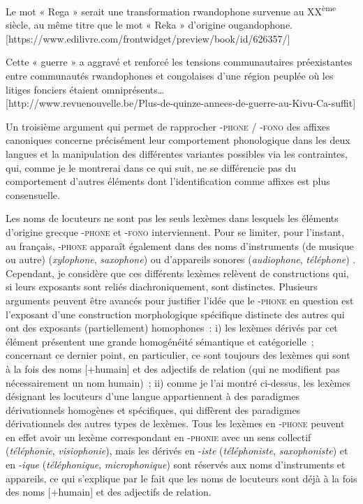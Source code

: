 \documentclass[output=paper]{langsci/langscibook}
\begin{document}
\ea\label{ex:Montermini:4}

  \ea\label{ex:Montermini:4a} Le mot « Rega » serait une transformation rwandophone survenue au
XX\textsuperscript{ème} siècle, au même titre que le mot « Reka »
d'origine ougandophone.\\

{[}https://www.edilivre.com/frontwidget/preview/book/id/626357/{]}

  \ex\label{ex:Montermini:4b} Cette « guerre » a aggravé et renforcé les tensions communautaires
préexistantes entre communautés rwandophones et congolaises d'une région
peuplée où les litiges fonciers étaient omniprésents\ldots{}\\

{[}http://www.revuenouvelle.be/Plus-de-quinze-annees-de-guerre-au-Kivu-Ca-suffit{]}
\z\z

Un troisième argument qui permet de rapprocher -\textsc{phone / -fono}
des affixes canoniques concerne précisément leur comportement
phonologique dans les deux langues et la manipulation des différentes
variantes possibles via les contraintes, qui, comme je le montrerai dans
ce qui suit, ne se différencie pas du comportement d'autres éléments
dont l'identification comme affixes est plus consensuelle.

Les noms de locuteurs ne sont pas les seuls lexèmes dans lesquels les
éléments d'origine grecque -\textsc{phone} et \textsc{-fono}
interviennent. Pour se limiter, pour l'instant, au français,
\textsc{-phone} apparaît également dans des noms d'instruments (de
musique ou autre) (\emph{xylophone}, \emph{saxophone}) ou d'appareils
sonores (\emph{audiophone}, \emph{téléphone}) %
\citep[cf.][179-183]{Lasserre2016}%
%
. Cependant, je considère que ces différents lexèmes relèvent de
constructions qui, si leurs exposants sont reliés diachroniquement, sont
distinctes. Plusieurs arguments peuvent être avancés pour justifier
l'idée que le \textsc{-phone} en question est l'exposant d'une
construction morphologique spécifique distincte des autres qui ont des
exposants (partiellement) homophones~: i) les lexèmes dérivés par cet
élément présentent une grande homogénéité sémantique et catégorielle~;
concernant ce dernier point, en particulier, ce sont toujours des
lexèmes qui sont à la fois des noms {[}+humain{]} et des adjectifs de
relation (qui ne modifient pas nécessairement un nom humain)~; ii) comme
je l'ai montré ci-dessus, les lexèmes désignant les locuteurs d'une
langue appartiennent à des paradigmes dérivationnels homogènes et
spécifiques, qui diffèrent des paradigmes dérivationnels des autres
types de lexèmes. Tous les lexèmes en -\textsc{phone} peuvent en effet
avoir un lexème correspondant en \textsc{-phonie} avec un sens collectif
(\emph{téléphonie}, \emph{visiophonie}), mais les dérivés en
-\emph{iste} (\emph{téléphoniste}, \emph{saxophoniste}) et en
-\emph{ique} (\emph{téléphonique}, \emph{microphonique}) sont réservés
aux noms d'instruments et appareils, ce qui s'explique par le fait que
les noms de locuteurs sont déjà à la fois des noms {[}+humain{]} et des
adjectifs de relation.
\end{document}
